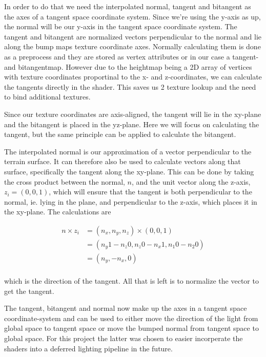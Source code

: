 In order to do that we need the interpolated normal, tangent and
bitangent as the axes of a tangent space coordinate system. Since
we're using the y-axis as up, the normal will be our y-axis in the
tangent space coordinate system. The tangent and bitangent are
normalized vectors perpendicular to the normal and lie along the bump
maps texture coordinate axes. Normally calculating them is done as a
preprocess and they are stored as vertex attributes or in our case a
tangent- and bitangentmap. However due to the heightmap being a 2D
array of vertices with texture coordinates proportinal to the x- and
z-coordinates, we can calculate the tangents directly in the
shader. This saves us 2 texture lookup and the need to bind additional
textures.

Since our texture coordinates are axis-aligned, the tangent will lie
in the xy-plane and the bitangent is placed in the yz-plane. Here we
will focus on calculating the tangent, but the same principle can be
applied to calculate the bitangent.

The interpolated normal is our approximation of a vector perpendicular
to the terrain surface. It can therefore also be used to calculate
vectors along that surface, specifically the tangent along the
xy-plane. This can be done by taking the cross product between the
normal, $n$, and the unit vector along the z-axis, $z_i = (0,0,1)$, which
will ensure that the tangent is both perpendicular to the normal, ie.
lying in the plane, and perpendicular to the z-axis, which places it
in the xy-plane. The calculations are

\begin{displaymath}
  \begin{array}{rl}
  n \times z_i &= (n_x, n_y, n_z) \times (0,0,1)\\
  &= (n_y 1 - n_z 0, n_z 0 - n_x 1, n_1 0 - n_2 0) \\
  &= (n_y, - n_x, 0) \\
  \end{array}
\end{displaymath}

which is the direction of the tangent. All that is left is to
normalize the vector to get the tangent.

The tangent, bitangent and normal now make up the axes in a tangent
space coordinate-system and can be used to either move the direction
of the light from global space to tangent space or move the bumped
normal from tangent space to global space. For this project the latter
was chosen to easier incorperate the shaders into a deferred lighting
pipeline in the future.

